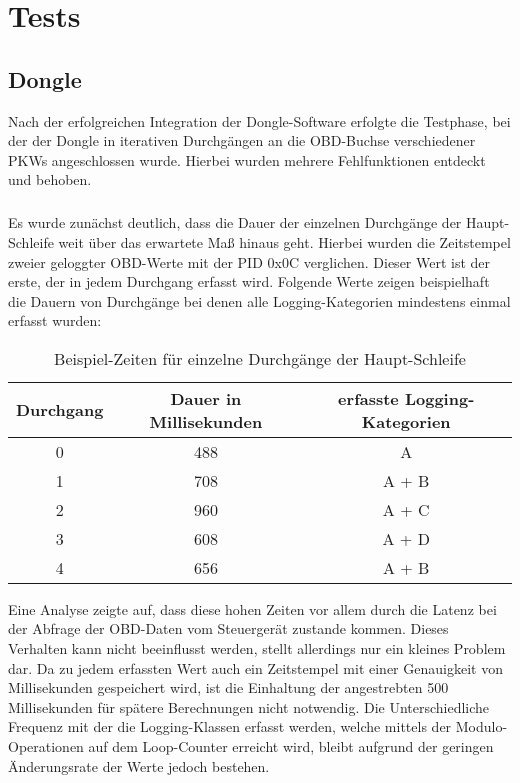 \chapter{Tests}

\section{Dongle}
\label{sec:dongleTest}
Nach der erfolgreichen Integration der Dongle-Software erfolgte die Testphase, bei der der Dongle in iterativen Durchgängen an die OBD-Buchse verschiedener PKWs angeschlossen wurde. Hierbei wurden mehrere Fehlfunktionen entdeckt und behoben.
\paragraph{}
Es wurde zunächst deutlich, dass die Dauer der einzelnen Durchgänge der Haupt-Schleife weit über das erwartete Maß hinaus geht. Hierbei wurden die Zeitstempel zweier geloggter OBD-Werte mit der PID 0x0C verglichen. Dieser Wert ist der erste, der in jedem Durchgang erfasst wird. Folgende Werte zeigen beispielhaft die Dauern von Durchgänge bei denen alle Logging-Kategorien mindestens einmal erfasst wurden:
\begin{table}
  \caption{Beispiel-Zeiten für einzelne Durchgänge der Haupt-Schleife}
  \label{tab:loopTimes}

  \begin{center}
    \begin{tabular}{|c|c|c|}
    \hline
      Durchgang & Dauer in Millisekunden & erfasste Logging-Kategorien\\ \hline
      0 & 488 & A\\ \hline
      1 & 708 & A + B\\ \hline
      2 & 960 & A + C\\ \hline
      3 & 608 & A + D\\ \hline
      4 & 656 & A + B\\ \hline
    \end{tabular}
  \end{center}
\end{table}
Eine Analyse zeigte auf, dass diese hohen Zeiten vor allem durch die Latenz bei der Abfrage der OBD-Daten vom Steuergerät zustande kommen. Dieses Verhalten kann nicht beeinflusst werden, stellt allerdings nur ein kleines Problem dar. Da zu jedem erfassten Wert auch ein Zeitstempel mit einer Genauigkeit von  Millisekunden gespeichert wird, ist die Einhaltung der angestrebten 500 Millisekunden für spätere Berechnungen nicht notwendig. Die Unterschiedliche Frequenz mit der die Logging-Klassen erfasst werden, welche mittels der Modulo-Operationen auf dem Loop-Counter erreicht wird, bleibt aufgrund der geringen Änderungsrate der Werte jedoch bestehen.
